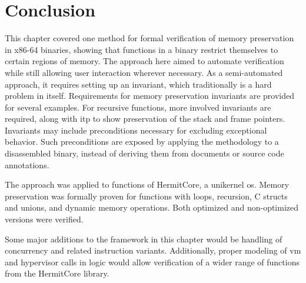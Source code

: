 \section{Conclusion}
This chapter covered one method for formal verification
of memory preservation in x86-64 binaries,
showing that functions in a binary restrict themselves to certain regions of memory.
The approach here aimed to automate verification
while still allowing user interaction wherever necessary.
As a semi-automated approach,
it requires setting up an invariant, which traditionally is a hard problem in itself.
Requirements for memory preservation invariants are provided for several examples.
For recursive functions, more involved invariants are required,
along with \ac{itp} to show preservation of the stack and frame pointers.
Invariants may include preconditions necessary for excluding exceptional behavior.
Such preconditions are exposed by applying the methodology to a disassembled binary,
instead of deriving them from documents or source code annotations.

The approach was applied to functions of HermitCore, a unikernel \ac{os}.
Memory preservation was formally proven for functions with loops, recursion,
C structs and unions, and dynamic memory operations.
Both optimized and non-optimized versions were verified.

Some major additions to the framework in this chapter
would be handling of concurrency and related instruction variants.
Additionally, proper modeling of \ac{vm} and hypervisor calls in logic
would allow verification of a wider range of functions from the HermitCore library.
